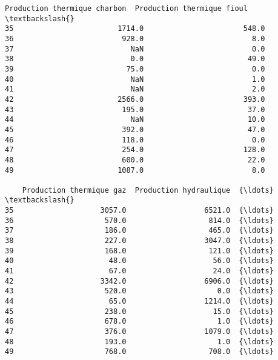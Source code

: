 \documentclass[11pt]{article}
\begin{document}
\begin{tcolorbox}[breakable, size=fbox, boxrule=.5pt, pad at break*=1mm, opacityfill=0]
\begin{Verbatim}[commandchars=\\\{\}]
    Production thermique charbon  Production thermique fioul  \textbackslash{}
35                        1714.0                       548.0
36                         928.0                         8.0
37                           NaN                         0.0
38                           0.0                        49.0
39                          75.0                         0.0
40                           NaN                         1.0
41                           NaN                         2.0
42                        2566.0                       393.0
43                         195.0                        37.0
44                           NaN                        10.0
45                         392.0                        47.0
46                         118.0                         0.0
47                         254.0                       128.0
48                         600.0                        22.0
49                        1087.0                         8.0

    Production thermique gaz  Production hydraulique  {\ldots}  \textbackslash{}
35                    3057.0                  6521.0  {\ldots}
36                     570.0                   814.0  {\ldots}
37                     186.0                   465.0  {\ldots}
38                     227.0                  3047.0  {\ldots}
39                     168.0                   121.0  {\ldots}
40                      48.0                    56.0  {\ldots}
41                      67.0                    24.0  {\ldots}
42                    3342.0                  6906.0  {\ldots}
43                     520.0                     0.0  {\ldots}
44                      65.0                  1214.0  {\ldots}
45                     238.0                    15.0  {\ldots}
46                     678.0                     1.0  {\ldots}
47                     376.0                  1079.0  {\ldots}
48                     193.0                     1.0  {\ldots}
49                     768.0                   708.0  {\ldots}


\end{Verbatim}
\end{tcolorbox}
\end{document}
